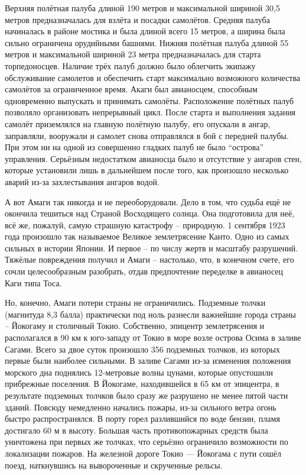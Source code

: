 Верхняя полётная палуба длиной 190 метров и максимальной шириной 30,5 метров предназначалась для взлёта и посадки самолётов. Средняя палуба начиналась в районе мостика и была длиной всего 15 метров, а ширина была сильно ограничена орудийными башнями. Нижняя полётная палуба длиной 55 метров и максимальной шириной 23 метра предназначалась для старта торпедоносцев. Наличие трёх палуб должно было облегчить экипажу обслуживание самолетов и обеспечить старт максимально возможного количества самолётов за ограниченное время. Акаги был авианосцем, способным одновременно выпускать и принимать самолёты. Расположение полётных палуб позволяло организовать непрерывный цикл. После старта и выполнения задания самолёт приземлялся на главную полётную палубу, его опускали в ангар, заправляли, вооружали и самолет снова отправлялся в бой с передней палубы. При этом ни на одной из совершенно гладких палуб не было “острова” управления. Серьёзным недостатком авианосца было и отсутствие у ангаров стен, которые установили лишь в дальнейшем после того, как произошло несколько аварий из-за захлестывания ангаров водой.

А вот Амаги так никогда и не переоборудовали. Дело в том, что судьба ещё не окончила тешиться над Страной Восходящего солнца. Она подготовила для неё, всё же, пожалуй, самую страшную катастрофу – природную. 1 сентября 1923 года произошло так называемое Великое землетрясение Канто. Одно из самых сильных в истории Японии. И первое – по числу жертв и масштабу разрушений. Тяжёлые повреждения получил и Амаги – настолько, что, в конечном счете, его сочли целесообразным разобрать, отдав предпочтение переделке в авианосец Каги типа Тоса.

Но, конечно, Амаги потери страны не ограничились. Подземные толчки (магнитуда 8,3 балла) практически под ноль разнесли важнейшие города страны – Йокогаму и столичный Токио. Собственно, эпицентр землетрясения и располагался в 90 км к юго-западу от Токио в море возле острова Осима в заливе Сагами. Всего за двое суток произошло 356 подземных толчков, из которых первые были наиболее сильными. В заливе Сагами из-за изменения положения морского дна поднялись 12-метровые волны цунами, которые опустошили прибрежные поселения. В Йокогаме, находившейся в 65 км от эпицентра, в результате подземных толчков было сразу же разрушено не менее пятой части зданий. Повсюду немедленно начались пожары, из-за сильного ветра огонь быстро распространялся. В порту горел разлившийся по воде бензин, пламя достигало 60 м в высоту. Большая часть противопожарных средств была уничтожена при первых же толчках, что серьёзно ограничило возможности по локализации пожаров. На железной дороге Токио — Йокогама с пути сошёл поезд, наткнувшись на вывороченные и скрученные рельсы.


